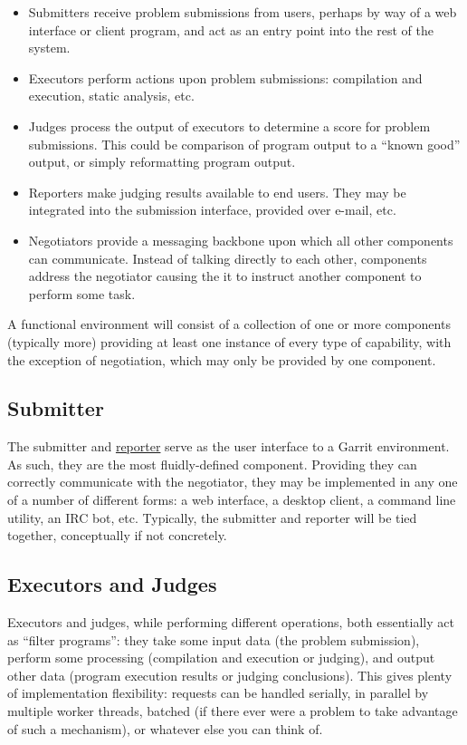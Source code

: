 \documentclass[11pt,letterpaper]{article}
\begin{document}
\begin{itemize}
\item Submitters receive problem submissions from users, perhaps by way of a
web interface or client program, and act as an entry point into the rest of the
system.
\item Executors perform actions upon problem submissions: compilation and
execution, static analysis, etc.
\item Judges process the output of executors to determine a score for problem
submissions. This could be comparison of program output to a ``known good''
output, or simply reformatting program output.
\item Reporters make judging results available to end users. They may be
integrated into the submission interface, provided over e-mail, etc.
\item Negotiators provide a messaging backbone upon which all other components
can communicate. Instead of talking directly to each other, components address
the negotiator causing the it to instruct another component to perform some
task.
\end{itemize}

A functional environment will consist of a collection of one or more components
(typically more) providing at least one instance of every type of capability,
with the exception of negotiation, which may only be provided by one component.

\subsection{Submitter}
\label{design-submitter}

The submitter and \hyperref[design-reporter]{reporter} serve as the user
interface to a Garrit environment. As such, they are the most fluidly-defined
component. Providing they can correctly communicate with the negotiator, they
may be implemented in any one of a number of different forms: a web interface,
a desktop client, a command line utility, an IRC bot, etc. Typically, the
submitter and reporter will be tied together, conceptually if not concretely.

\subsection{Executors and Judges}
\label{design-exec-judge}

Executors and judges, while performing different operations, both essentially
act as ``filter programs'': they take some input data (the problem submission),
perform some processing (compilation and execution or judging), and output
other data (program execution results or judging conclusions). This gives
plenty of implementation flexibility: requests can be handled serially, in
parallel by multiple worker threads, batched (if there ever were a problem
to take advantage of such a mechanism), or whatever else you can think of.
\end{document}
